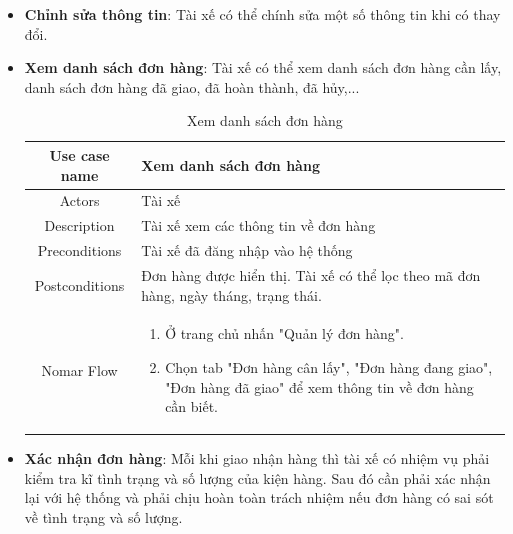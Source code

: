 \begin{itemize}
\begin{itemize}
		\item \textbf{Chỉnh sửa thông tin}: Tài xế có thể chính sửa một số thông tin khi có thay đổi.
		
		\item \textbf{Xem danh sách đơn hàng}: Tài xế có thể xem danh sách đơn hàng cần lấy, danh sách đơn hàng đã giao, đã hoàn thành, đã hủy,...
		
		\begin{table}[!htp]
			\centering\begin{tabular}{|c|m{25em}|}
				\hline 
				Use case name & Xem danh sách đơn hàng\\ 
				\hline 
				Actors & Tài xế \\ 
				\hline
				Description & Tài xế xem các thông tin về đơn hàng \\
				\hline 
				Preconditions & Tài xế đã đăng nhập vào hệ thống \\
				\hline
				Postconditions & Đơn hàng được hiển thị. Tài xế có thể lọc theo mã đơn hàng, ngày tháng, trạng thái. \\
				\hline
				Nomar Flow & \begin{enumerate}
					\item Ở trang chủ nhấn "Quản lý đơn hàng".
					\item Chọn tab "Đơn hàng cân lấy", "Đơn hàng đang giao", "Đơn hàng đã giao" để xem thông tin về đơn hàng cần biết.	
				\end{enumerate}
				\\
				\hline
			\end{tabular}
			\caption{Xem danh sách đơn hàng}
		\end{table}
	
	\newpage
	
	
		\item \textbf{Xác nhận đơn hàng}: Mỗi khi giao nhận hàng thì tài xế có nhiệm vụ phải kiểm tra kĩ tình trạng và số lượng của kiện hàng. Sau đó cần phải xác nhận lại với hệ thống và phải chịu hoàn toàn trách nhiệm nếu đơn hàng có sai sót về tình trạng và số lượng.
		

\end{itemize}
\end{itemize}
